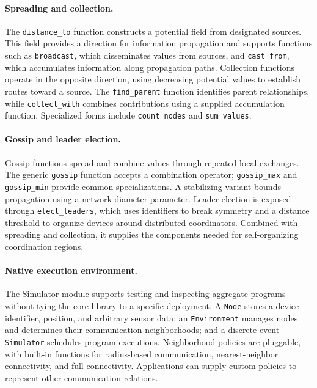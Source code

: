 \paragraph{Spreading and collection.}
The \texttt{distance\_\allowbreak to} function constructs a potential field from
 designated sources.
%
This field provides a direction for information propagation and supports
 functions such as \texttt{broadcast}, which disseminates values from sources,
 and \texttt{cast\_\allowbreak from}, which accumulates information along propagation paths.
%
Collection functions operate in the opposite direction, using decreasing
 potential values to establish routes toward a source.
%
The \texttt{find\_\allowbreak parent} function identifies parent relationships, while
 \texttt{collect\_\allowbreak with} combines contributions using a supplied accumulation
 function.
%
Specialized forms include \texttt{count\_\allowbreak nodes} and \texttt{sum\_\allowbreak values}.

\paragraph{Gossip and leader election.}
Gossip functions spread and combine values through repeated local exchanges.
%
The generic \texttt{gossip} function accepts a combination operator;
 \texttt{gossip\_\allowbreak max} and \texttt{gossip\_\allowbreak min} provide common specializations.
%
A stabilizing variant bounds propagation using a network-diameter parameter.
%
Leader election is exposed through \texttt{elect\_\allowbreak leaders}, which uses
 identifiers to break symmetry and a distance threshold to organize devices
 around distributed coordinators.
%
Combined with spreading and collection, it supplies the components needed
 for self-organizing coordination regions.

\paragraph{Native execution environment.}
The Simulator module supports testing and inspecting aggregate programs
 without tying the core library to a specific deployment.
%
A \texttt{Node} stores a device identifier, position, and arbitrary sensor
 data; an \texttt{Environment} manages nodes and determines their
 communication neighborhoods; and a discrete-event \texttt{Simulator}
 schedules program executions.
%
Neighborhood policies are pluggable, with built-in functions for
 radius-based communication, nearest-neighbor connectivity, and full connectivity.
%
Applications can supply custom policies to represent other communication relations.

